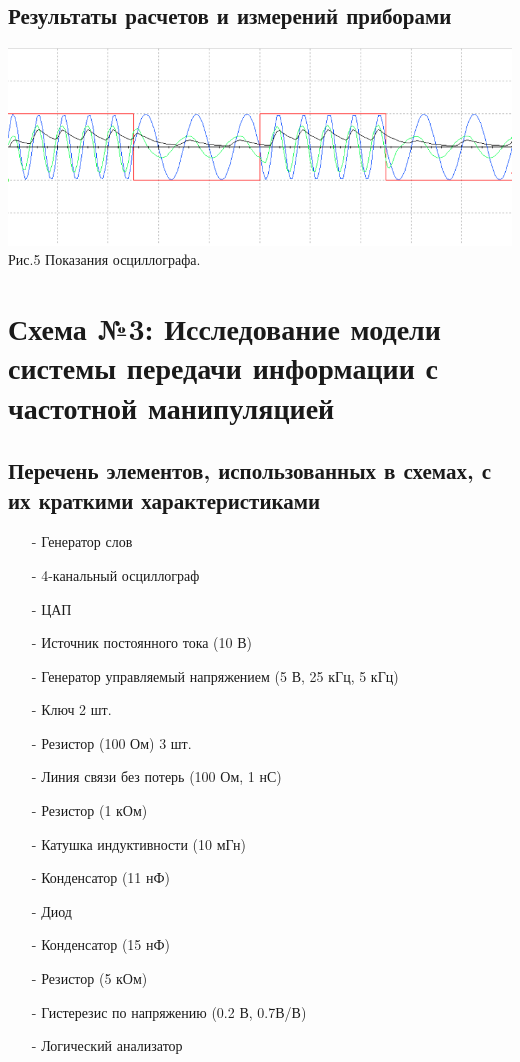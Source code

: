\documentclass[11pt]{article}
\begin{document}
\subsection{Результаты расчетов и измерений приборами}
\begin{center}
    \includegraphics[width=1\linewidth]{img/osc2.png}
        Рис.5 Показания осциллографа.
\end{center}


\newpage
\section{Схема №3: Исследование модели системы передачи информации с частотной манипуляцией}
\subsection{Перечень элементов, использованных в схемах, с
их краткими характеристиками}
\begin{itemize}
    \item[-] Генератор слов 
    \item[-] 4-канальный осциллограф
    \item[-] ЦАП
    \item[-] Источник постоянного тока (10 В)
    \item[-] Генератор управляемый напряжением (5 В, 25 кГц, 5 кГц)
    \item[-] Ключ 2 шт.
    \item[-] Резистор (100 Ом) 3 шт.
    \item[-] Линия связи без потерь (100 Ом, 1 нС)
    \item[-] Резистор (1 кОм)
    \item[-] Катушка индуктивности (10 мГн)
    \item[-] Конденсатор (11 нФ)
    \item[-] Диод
    \item[-] Конденсатор (15 нФ)
    \item[-] Резистор (5 кОм)
    \item[-] Гистерезис по напряжению (0.2 В, 0.7В/В)
    \item[-] Логический анализатор
\end{itemize}
\end{document}
